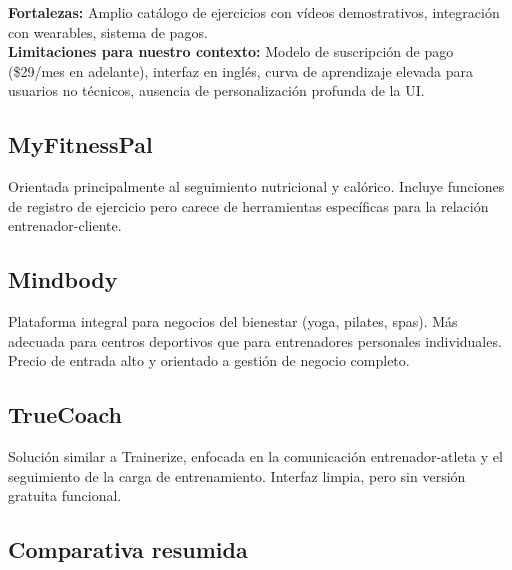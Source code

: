 \textbf{Fortalezas:} Amplio catálogo de ejercicios con vídeos demostrativos, integración con wearables, sistema de pagos.\\
\textbf{Limitaciones para nuestro contexto:} Modelo de suscripción de pago (\$29/mes en adelante), interfaz en inglés, curva de aprendizaje elevada para usuarios no técnicos, ausencia de personalización profunda de la UI.

\subsection{MyFitnessPal}

Orientada principalmente al seguimiento nutricional y calórico. Incluye funciones de registro de ejercicio pero carece de herramientas específicas para la relación entrenador-cliente.

\subsection{Mindbody}

Plataforma integral para negocios del bienestar (yoga, pilates, spas). Más adecuada para centros deportivos que para entrenadores personales individuales. Precio de entrada alto y orientado a gestión de negocio completo.

\subsection{TrueCoach}

Solución similar a Trainerize, enfocada en la comunicación entrenador-atleta y el seguimiento de la carga de entrenamiento. Interfaz limpia, pero sin versión gratuita funcional.

\subsection{Comparativa resumida}

